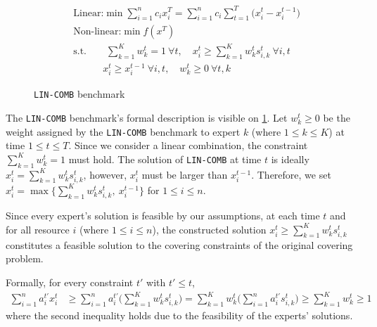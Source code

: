 \begin{figure}
	\vspace{-0.8cm}
	\begin{mdframed}
		\vspace{-0.4cm}
		\begin{align*}
			&\text{Linear:} \min \sum_{i=1}^{n} c_{i} x_{i}^{T} = \sum_{i=1}^{n} c_{i} \sum_{t=1}^{T} \bigl( x_{i}^{t} - x_{i}^{t-1}\bigr)\\
			&\text{Non-linear:} \min f(x^{T})\\
		&\text{s.t.} \qquad 
			\sum_{k=1}^{K} w_{k}^{t} = 1 ~\forall t,  \quad
			 x_{i}^{t} \geq \sum_{k=1}^{K} w_{k}^{t} s_{i,k}^{t}  ~\forall i, t\\
		& \qquad	\quad x_{i}^{t} \geq x_{i}^{t-1} ~\forall i, t, \quad
			 w_{k}^{t} \geq 0   ~\forall t, k
		\end{align*}
	\end{mdframed}
	\vspace{-0.3cm}
	\caption{\texttt{LIN-COMB} benchmark}
	\label{fig:benchmark}
	\vspace{-0.5cm}
\end{figure}

The \texttt{LIN-COMB} benchmark's formal description is visible on \cref{fig:benchmark}.
Let $w_{k}^{t} \geq 0$ be the weight assigned by the \texttt{LIN-COMB} benchmark to expert $k$ (where $1 \leq k \leq K$) at time
$1 \leq t \leq T$.
Since we consider a linear combination, the constraint $ \sum_{k=1}^{K} w_{k}^{t} = 1$ must hold.
The solution of \texttt{LIN-COMB} at time $t$ is ideally $x_{i}^{t} = \sum_{k=1}^{K} w_{k}^{t} s_{i,k}^{t}$,
however, $x_{i}^{t}$ must be larger than $x_{i}^{t-1}$.
Therefore, we set $x_{i}^{t} = \max\bigl\{\sum_{k=1}^{K} w_{k}^{t} s_{i,k}^{t},\ x_{i}^{t-1}\bigr\}$ for $1 \leq i \leq n$.
%


Since every expert's solution is feasible by our assumptions, at each time $t$ and for all resource $i$ (where $1 \leq i \leq n$),
the constructed solution $x_{i}^{t} \geq \sum_{k=1}^{K} w_{k}^{t} s_{i,k}^{t}$ constitutes a feasible solution to the covering constraints of the original covering problem.

\noindent Formally, for every constraint $t'$ with $t' \leq t$,
%
\begin{align*}
	\sum_{i=1}^{n} a_{i}^{t'} x_{i}^{t} &\geq
	\sum_{i=1}^{n} a_{i}^{t'} \biggl( \sum_{k=1}^{K} w_{k}^{t} s_{i,k}^{t} \biggr)
	= \sum_{k=1}^{K} w_{k}^{t}  \biggl( \sum_{i=1}^{n} a_{i}^{t'} s_{i,k}^{t} \biggr) 
	 \geq \sum_{k=1}^{K} w_{k}^{t} \geq 1
\end{align*}
%
where the second inequality holds due to the feasibility of the experts' solutions.
%


